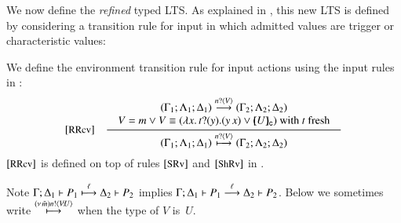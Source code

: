 \smallskip 
\noi We now define the \emph{refined} typed LTS. 
As explained in , this new LTS is defined 
by considering a transition rule for input in which admitted values are
trigger or characteristic values:

\smallskip 

\begin{definition}
	\label{def:rlts}
	We define the environment transition rule for input actions 
	using the input rules in :
	\[
	\begin{array}{rl}
			\eltsrule{RRcv}&\tree {
	\begin{array}{c}
	(\Gamma_1; \Lambda_1; \Delta_1) \by{\bactinp{n}{V}} (\Gamma_2; \Lambda_2; \Delta_2)
	\\
				\begin{array}{lll}
					V = m \vee V  \scong
					(\abs{{x}}{\binp{t}{y} (\appl{y}{{x}})}
					\vee  \omapchar{U}%
					)  \textrm{ with } t \textrm{ fresh} 
				\end{array}
				\end{array}
			}{
				(\Gamma_1; \Lambda_1; \Delta_1) \hby{\bactinp{n}{V}} (\Gamma_2; \Lambda_2; \Delta_2)
			}
	\end{array}
	\]
	\noi $\eltsrule{RRcv}$ is defined on top
	of rules $\eltsrule{SRv}$ and $\eltsrule{ShRv}$
	in .
\end{definition}

\smallskip 

\noi Note 
$\Gamma; \Delta_1 \vdash P_1 \stackrel{\ell}{\longmapsto} \Delta_2 \vdash P_2$ implies  
$\Gamma; \Delta_1 \vdash P_1 \stackrel{\ell}{\longrightarrow} \Delta_2 \vdash P_2$.
Below we sometimes write  
$\stackrel{(\nu\, \tilde{m}) n ! \langle V \! : \! U \rangle}{\longmapsto}$
when the type of $V$ is~$U$.


